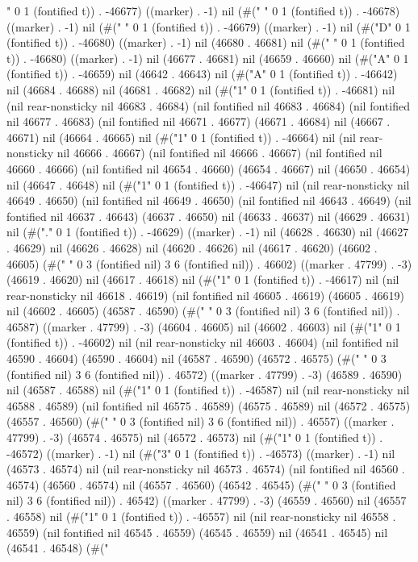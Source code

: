 " 0 1 (fontified t)) . -46677) ((marker) . -1) nil (#(" " 0 1 (fontified t)) . -46678) ((marker) . -1) nil (#(" " 0 1 (fontified t)) . -46679) ((marker) . -1) nil (#("D" 0 1 (fontified t)) . -46680) ((marker) . -1) nil (46680 . 46681) nil (#(" " 0 1 (fontified t)) . -46680) ((marker) . -1) nil (46677 . 46681) nil (46659 . 46660) nil (#("A" 0 1 (fontified t)) . -46659) nil (46642 . 46643) nil (#("A" 0 1 (fontified t)) . -46642) nil (46684 . 46688) nil (46681 . 46682) nil (#("1" 0 1 (fontified t)) . -46681) nil (nil rear-nonsticky nil 46683 . 46684) (nil fontified nil 46683 . 46684) (nil fontified nil 46677 . 46683) (nil fontified nil 46671 . 46677) (46671 . 46684) nil (46667 . 46671) nil (46664 . 46665) nil (#("1" 0 1 (fontified t)) . -46664) nil (nil rear-nonsticky nil 46666 . 46667) (nil fontified nil 46666 . 46667) (nil fontified nil 46660 . 46666) (nil fontified nil 46654 . 46660) (46654 . 46667) nil (46650 . 46654) nil (46647 . 46648) nil (#("1" 0 1 (fontified t)) . -46647) nil (nil rear-nonsticky nil 46649 . 46650) (nil fontified nil 46649 . 46650) (nil fontified nil 46643 . 46649) (nil fontified nil 46637 . 46643) (46637 . 46650) nil (46633 . 46637) nil (46629 . 46631) nil (#("." 0 1 (fontified t)) . -46629) ((marker) . -1) nil (46628 . 46630) nil (46627 . 46629) nil (46626 . 46628) nil (46620 . 46626) nil (46617 . 46620) (46602 . 46605) (#("      " 0 3 (fontified nil) 3 6 (fontified nil)) . 46602) ((marker . 47799) . -3) (46619 . 46620) nil (46617 . 46618) nil (#("1" 0 1 (fontified t)) . -46617) nil (nil rear-nonsticky nil 46618 . 46619) (nil fontified nil 46605 . 46619) (46605 . 46619) nil (46602 . 46605) (46587 . 46590) (#("      " 0 3 (fontified nil) 3 6 (fontified nil)) . 46587) ((marker . 47799) . -3) (46604 . 46605) nil (46602 . 46603) nil (#("1" 0 1 (fontified t)) . -46602) nil (nil rear-nonsticky nil 46603 . 46604) (nil fontified nil 46590 . 46604) (46590 . 46604) nil (46587 . 46590) (46572 . 46575) (#("      " 0 3 (fontified nil) 3 6 (fontified nil)) . 46572) ((marker . 47799) . -3) (46589 . 46590) nil (46587 . 46588) nil (#("1" 0 1 (fontified t)) . -46587) nil (nil rear-nonsticky nil 46588 . 46589) (nil fontified nil 46575 . 46589) (46575 . 46589) nil (46572 . 46575) (46557 . 46560) (#("      " 0 3 (fontified nil) 3 6 (fontified nil)) . 46557) ((marker . 47799) . -3) (46574 . 46575) nil (46572 . 46573) nil (#("1" 0 1 (fontified t)) . -46572) ((marker) . -1) nil (#("3" 0 1 (fontified t)) . -46573) ((marker) . -1) nil (46573 . 46574) nil (nil rear-nonsticky nil 46573 . 46574) (nil fontified nil 46560 . 46574) (46560 . 46574) nil (46557 . 46560) (46542 . 46545) (#("      " 0 3 (fontified nil) 3 6 (fontified nil)) . 46542) ((marker . 47799) . -3) (46559 . 46560) nil (46557 . 46558) nil (#("1" 0 1 (fontified t)) . -46557) nil (nil rear-nonsticky nil 46558 . 46559) (nil fontified nil 46545 . 46559) (46545 . 46559) nil (46541 . 46545) nil (46541 . 46548) (#("

